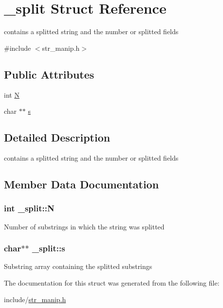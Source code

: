 \hypertarget{struct__split}{\section{\+\_\+split Struct Reference}
\label{struct__split}
}


contains a splitted string and the number or splitted fields  




{\ttfamily \#include $<$str\+\_\+manip.\+h$>$}

\subsection*{Public Attributes}
\begin{DoxyCompactItemize}
\item 
int \hyperlink{struct__split_af3261bd49762652bb67cc1e76300f582}{N}
\item 
char $\ast$$\ast$ \hyperlink{struct__split_a84d5273295857f35a812eeab15ae607f}{s}
\end{DoxyCompactItemize}


\subsection{Detailed Description}
contains a splitted string and the number or splitted fields 

\subsection{Member Data Documentation}
\hypertarget{struct__split_af3261bd49762652bb67cc1e76300f582}{
\subsubsection[{N}]{\setlength{\rightskip}{0pt plus 5cm}int \+\_\+split\+::\+N}}\label{struct__split_af3261bd49762652bb67cc1e76300f582}
Number of substrings in which the string was splitted \hypertarget{struct__split_a84d5273295857f35a812eeab15ae607f}{
\subsubsection[{s}]{\setlength{\rightskip}{0pt plus 5cm}char$\ast$$\ast$ \+\_\+split\+::s}}\label{struct__split_a84d5273295857f35a812eeab15ae607f}
Substring array containing the splitted substrings 

The documentation for this struct was generated from the following file\+:\begin{DoxyCompactItemize}
\item 
include/\hyperlink{str__manip_8h}{str\+\_\+manip.\+h}\end{DoxyCompactItemize}
